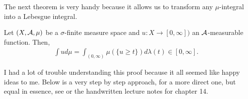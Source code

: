 The next theorem is very handy because it allows us to transform any $\mu$-integral into a Lebesgue integral.

\begin{thm}
	Let $(X, \mathcal{A}, \mu)$ be a $\sigma$-finite measure space and $u: X \to [0, \infty])$ an $\mathcal{A}$-measurable function. Then,
	\begin{align}
		\int u d\mu = \int_{(0, \infty)} \mu(\{u \geq t\}) d\lambda(t) \in [0, \infty].
	\end{align}
\end{thm}

I had a lot of trouble understanding this proof because it all seemed like happy ideas to me. Below is a very step by step approach, for a more direct one, but equal in essence, see \cite[p. 146]{schilling2017} or the handwritten lecture notes for chapter 14.


